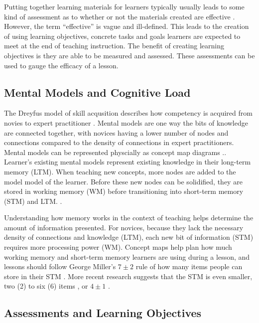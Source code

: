 \documentclass[040-assessment.tex]{subfiles}
\begin{document}
Putting together learning materials for learners typically usually leads to some kind of
assessment as to whether or not the materials created are effective
\cite{ambrose2010learning, wilson2019teaching}.
However, the term ``effective'' is vague and ill-defined.
This leads to the creation of using learning objectives,
concrete tasks and goals learners are expected to meet at the end of teaching instruction.
The benefit of creating learning objectives is they are able to be measured and assessed.
These assessments can be used to gauge the efficacy of a lesson.

\subsection{Mental Models and Cognitive Load}

The Dreyfus model of skill acqusition describes how competency is acquired from
novies to expert practitioner
\cite{dreyfus1980five, bennerUsingDreyfusModel2004}.
Mental models are one way the bits of knowledge are connected together,
with novices having a lower number of nodes and connections compared to the
density of connections in expert practitioners.
Mental models can be represented physcially as concept map diagrams
\cite{Koch2016, wilson2019teaching}..
Learner's existing mental models represent existing knowledge in their long-term memory (LTM).
When teaching new concepts,
more nodes are added to the model model of the learner.
Before these new nodes can be solidified, they are stored in working memory (WM)
before transitioning into short-term memory (STM) and LTM.
\cite{Koch2016, hermansProgrammerBrain2021, wilson2019teaching}.

Understanding how memory works in the context of teaching
helps determine the amount of information presented.
For novices, because they lack the necessary density of connections and knowledge (LTM),
each new bit of information (STM) requires more processing power (WM).
Concept maps help plan how much working memory and short-term memory learners are using during a lesson,
and lessons should follow George Miller's $7\pm2$ rule of how many items people can store in their STM
\cite{miller1956magical}.
More recent research suggests that the STM is even smaller, two (2) to six (6) items
\cite{hermansProgrammerBrain2021},
or $4\pm1$ \cite{didauWhatEveryTeacher2016}.

\subsection{Assessments and Learning Objectives}
\end{document}
